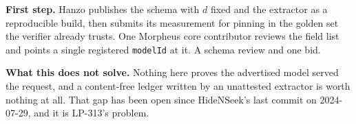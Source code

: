 \documentclass[10pt,a4paper]{article}
\newcommand{\code}[1]{\texttt{\small #1}}
\begin{document}
\vspace{0.4ex}
\noindent\textbf{First step.} Hanzo publishes the schema with $d$ fixed and the extractor as a
reproducible build, then submits its measurement for pinning in the golden set the verifier
already trusts. One Morpheus core contributor reviews the field list and points a single
registered \code{modelId} at it. A schema review and one bid.

\vspace{0.35ex}
\noindent\textbf{What this does not solve.} Nothing here proves the advertised model served the
request, and a content-free ledger written by an unattested extractor is worth nothing at all.
That gap has been open since HideNSeek's last commit on 2024-07-29, and it is LP-313's problem.

\vspace{0.4ex}
\end{document}

